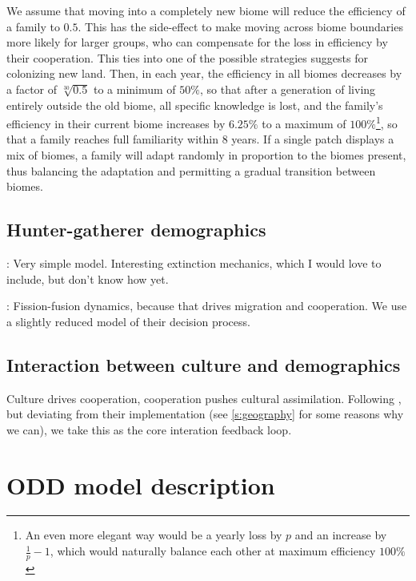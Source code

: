 \documentclass[a4paper,12pt]{scrartcl}
\begin{document}
We assume that moving into a completely new biome will reduce the efficiency of
a family to $0.5$. This has the side-effect to make moving across biome
boundaries more likely for larger groups, who can compensate for the loss in
efficiency by their cooperation. This ties into one of the possible strategies
\textcite{kelly2003colonization} suggests for colonizing new land. Then, in each
year, the efficiency in all biomes decreases by a factor of $\sqrt[30]{0.5}$ to
a minimum of $50\%$, so that after a generation of living entirely outside the
old biome, all specific knowledge is lost, and the family's efficiency in their
current biome increases by $6.25\%$ to a maximum of $100\%$\footnote{An even
  more elegant way would be a yearly loss by $p$ and an increase by $\frac{1}{p}
  -1$, which would naturally balance each other at maximum efficiency $100\%$}, so
that a family reaches full familiarity within 8 years. If a single patch
displays a mix of biomes, a family will adapt randomly in proportion to the
biomes present, thus balancing the adaptation and permitting a gradual
transition between biomes.

\subsection{Hunter-gatherer demographics}
\label{s:demographics}

\textcite{hamilton2018stochastic}: Very simple model. Interesting extinction
mechanics, which I would love to include, but don't know how yet.

\textcite{crema2014simulation}: Fission-fusion dynamics, because that drives
migration and cooperation. We use a slightly reduced model of their decision
process.

\subsection{Interaction between culture and demographics}
\label{s:interaction}

Culture drives cooperation, cooperation pushes cultural assimilation. Following
\parencite{barcelo2014social,barcelo2015simulating}, but deviating from their
implementation (see \cref{s:geography} for some reasons why we can), we take this
as the core interation feedback loop.

\section{ODD model description}
\label{s:odd}
\end{document}
